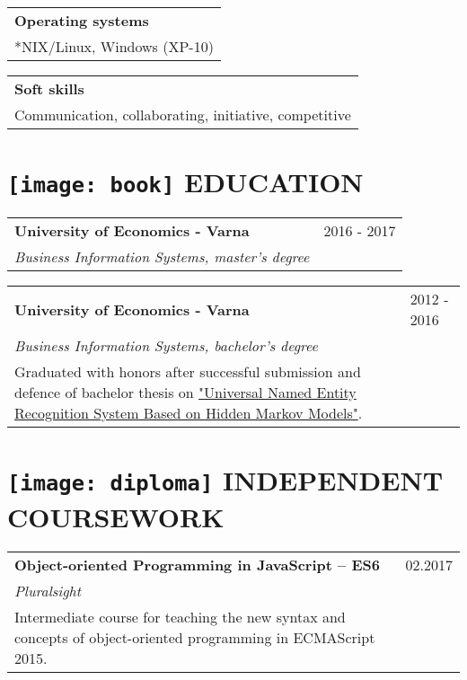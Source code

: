 \documentclass[a4paper,10pt]{article}
\begin{document}
\begin{tabular}{|l}
    \textbf{Operating systems} \\
    \**NIX/Linux, Windows (XP-10)\\
\end{tabular}

\begin{tabular}{|l}
    \textbf{Soft skills} \\
    Communication, collaborating, initiative, competitive \\
\end{tabular}

\section{\protect\texttt{[image: book]} EDUCATION}

\begin{tabular}{|p{11cm}l}
\textbf{University of Economics - Varna} & 2016 - 2017 \\
    \emph{Business Information Systems, master's degree} & \\ 
\end{tabular}

\begin{tabular}{|p{11cm}l}
\textbf{University of Economics - Varna} & 2012 - 2016 \\
    \emph{Business Information Systems, bachelor's degree} & \\
\footnotesize{Graduated with honors after successful submission and defence of bachelor thesis on
    \href{https://drive.google.com/file/d/0BwIBVx4v5C8qSFZ2eXpOMTN2TE0/view}{"Universal Named Entity Recognition System Based on Hidden Markov Models"}.} & \\
\end{tabular}

\section{\protect\texttt{[image: diploma]} INDEPENDENT COURSEWORK}

\begin{tabular}{|p{11cm}l}
\textbf{Object-oriented Programming in JavaScript – ES6} & 02.2017 \\
    \emph{Pluralsight} & \\
    \footnotesize{Intermediate course for teaching the new syntax and concepts of object-oriented
programming in ECMAScript 2015.} \\
\end{tabular}
\end{document}
